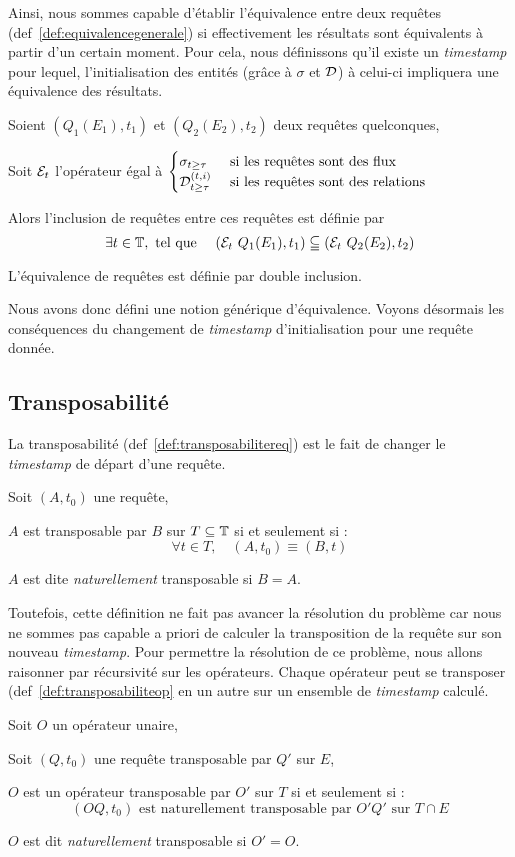 Ainsi, nous sommes capable d'établir l'équivalence entre deux requêtes (def~\ref{def:equivalencegenerale}) si effectivement les résultats sont équivalents à partir d'un certain moment. Pour cela, nous définissons qu'il existe un \textit{timestamp} pour lequel, l'initialisation des entités (grâce à $\sigma$ et $\mathcal{D}$) à celui-ci impliquera une équivalence des résultats.
\begin{defi}\label{def:equivalencegenerale}
    Soient $(Q_1(E_1),t_1)$ et $(Q_2(E_2),t_2)$ deux requêtes quelconques,

    Soit $\mathcal{E}_t$ l'opérateur égal à $\begin{cases} \sigma_{t\geq \tau} & \textrm{ si les requêtes sont des flux}\\ \mathcal{D}_{t\geq \tau}^{(t,i)} & \textrm{  si les requêtes sont des relations}\end{cases}$

    Alors l'inclusion de requêtes entre ces requêtes est définie par $$\exists t \in \mathbb{T}, \textrm{ tel que } \quad (\mathcal{E}_t\ Q_1(E_1), t_1) \subseteqq (\mathcal{E}_t\  Q_2(E_2), t_2)$$

    L'équivalence de requêtes est définie par double inclusion.
\end{defi}

Nous avons donc défini une notion générique d'équivalence. Voyons désormais les conséquences du changement de \textit{timestamp} d'initialisation pour une requête donnée.
\subsection{Transposabilité}
La transposabilité (def~\ref{def:transposabilitereq}) est le fait de changer le \textit{timestamp} de départ d'une requête.
\begin{defi}\label{def:transposabilitereq}
    Soit $(A,t_0)$ une requête,

    $A$ est transposable par $B$ sur $T\subseteq \mathbb{T}$ si et seulement si : $$\forall t\in T, \quad (A,t_0) \equiv (B,t)$$

    $A$ est dite \textit{naturellement} transposable si $B=A$.
\end{defi}
Toutefois, cette définition ne fait pas avancer la résolution du problème car nous ne sommes pas capable a priori de calculer la transposition de la requête sur son nouveau \textit{timestamp}. Pour permettre la résolution de ce problème, nous allons raisonner par récursivité sur les opérateurs. Chaque opérateur peut se transposer (def~\ref{def:transposabiliteop} en un autre sur un ensemble de \textit{timestamp} calculé.
\begin{defi}\label{def:transposabiliteop}
    Soit $O$ un opérateur unaire,

    Soit $(Q,t_0)$ une requête transposable par $Q'$ sur $E$,

    $O$ est un opérateur transposable par $O'$ sur $T$ si et seulement si : $$(OQ,t_0) \textrm{ est naturellement transposable par } O'Q' \textrm{ sur } T\cap E$$

    $O$ est dit \textit{naturellement} transposable si $O'=O$.
\end{defi}

